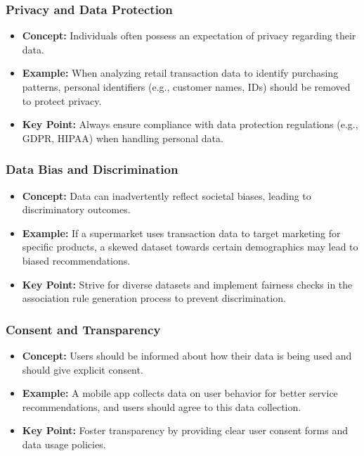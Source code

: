 \documentclass[aspectratio=169]{beamer}
\begin{document}
\begin{frame}[fragile]
    \frametitle{Privacy and Data Protection}
    \begin{itemize}
        \item \textbf{Concept:} Individuals often possess an expectation of privacy regarding their data.
        \item \textbf{Example:} When analyzing retail transaction data to identify purchasing patterns, personal identifiers (e.g., customer names, IDs) should be removed to protect privacy.
        \item \textbf{Key Point:} Always ensure compliance with data protection regulations (e.g., GDPR, HIPAA) when handling personal data.
    \end{itemize}
\end{frame}

\begin{frame}[fragile]
    \frametitle{Data Bias and Discrimination}
    \begin{itemize}
        \item \textbf{Concept:} Data can inadvertently reflect societal biases, leading to discriminatory outcomes.
        \item \textbf{Example:} If a supermarket uses transaction data to target marketing for specific products, a skewed dataset towards certain demographics may lead to biased recommendations.
        \item \textbf{Key Point:} Strive for diverse datasets and implement fairness checks in the association rule generation process to prevent discrimination.
    \end{itemize}
\end{frame}

\begin{frame}[fragile]
    \frametitle{Consent and Transparency}
    \begin{itemize}
        \item \textbf{Concept:} Users should be informed about how their data is being used and should give explicit consent.
        \item \textbf{Example:} A mobile app collects data on user behavior for better service recommendations, and users should agree to this data collection.
        \item \textbf{Key Point:} Foster transparency by providing clear user consent forms and data usage policies.
    \end{itemize}
\end{frame}
\end{document}
